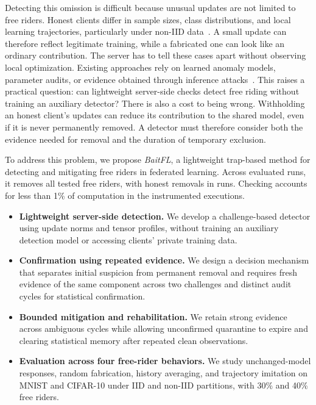 \documentclass[conference]{IEEEtran}
\begin{document}
Detecting this omission is difficult because unusual updates are not limited
to free riders. Honest clients differ in sample sizes, class distributions,
and local learning trajectories, particularly under non-IID
data~\cite{kairouz2021advances}. A small update can therefore reflect
legitimate training, while a fabricated one can look like an ordinary
contribution. The server has to tell these cases apart without observing
local optimization. Existing approaches rely on learned anomaly models,
parameter audits, or evidence obtained through inference
attacks~\cite{lin2019freeriders,wang2024pass,recasens2026frida}. This raises a
practical question: can lightweight server-side checks detect free riding
without training an auxiliary detector? There is also a cost to being wrong.
Withholding an honest client's updates can reduce its contribution to the shared
model, even if it is never permanently removed. A detector must therefore
consider both the evidence needed for removal and the duration of temporary
exclusion.

To address this problem, we propose \emph{BaitFL}, a lightweight trap-based
method for detecting and mitigating free riders in federated learning.
Across \ReviewRunCount{} evaluated runs, it removes all tested free riders,
with \MultiFP{} honest removals in \ReviewAffectedRuns{} runs. Checking
accounts for less than 1\% of computation in the instrumented executions.

\begin{itemize} %
\item \textbf{Lightweight server-side detection.} We develop a challenge-based
detector using update norms and tensor profiles, without training an auxiliary
detection model or accessing clients' private training data.
\item \textbf{Confirmation using repeated evidence.} We design a decision
mechanism that separates initial suspicion from permanent removal and requires
fresh evidence of the same component across two challenges and distinct audit
cycles for statistical confirmation.
\item \textbf{Bounded mitigation and rehabilitation.} We retain strong evidence
across ambiguous cycles while allowing unconfirmed quarantine to expire and
clearing statistical memory after repeated clean observations.
\item \textbf{Evaluation across four free-rider behaviors.} We study unchanged-model
responses, random fabrication, history averaging, and trajectory imitation on
MNIST and CIFAR-10 under IID and non-IID partitions, with 30\% and 40\% free riders.
\end{itemize}
\end{document}
